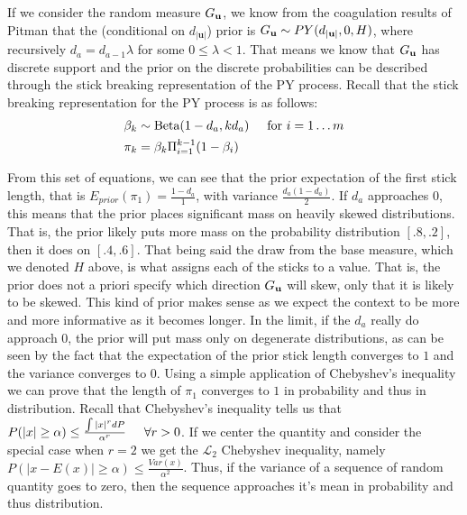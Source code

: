 \documentclass[11pt]{amsart}
\newcommand{\ubf}{\mathbf{u}}
\begin{document}
If we consider the random measure $G_{\bf{u}}$, we know from the coagulation results of Pitman \cite{pitman99} that the (conditional on $d_{|\ubf|}$) prior is  $G_{\bf{u}} \sim PY (d_{|\ubf|},0,{H})$, where recursively $d_a = d_{a-1}\lambda$ for some $0\leq \lambda < 1$.  That means we know that $G_{\bf{u}}$ has discrete support and the prior on the discrete probabilities can be described through the stick breaking representation of the PY process. Recall that the stick breaking representation for the PY process is as follows:
\begin{align*}
	\beta_k &\sim \textrm{Beta}(1-d_a, kd_a) \hspace{.5cm} \textrm{for } i = 1 \dots m \\
	\pi_k &= \beta_k \Pi_{i = 1}^{k-1}(1 - \beta_i)
\end{align*}

From this set of equations, we can see that the prior expectation of the first stick length, that is $E_{prior}(\pi_1) = \frac{1-d_a}{1}$, with variance $\frac{d_a(1-d_a)}{2}$.  If $d_a$ approaches $0$, this means that the prior places significant mass on heavily skewed distributions.  That is, the prior likely puts more mass on the probability distribution $[.8, .2]$, then it does on $[.4, .6]$.  That being said the draw from the base measure, which we denoted ${H}$ above, is what assigns each of the sticks to a value.  That is, the prior does not a priori specify which direction $G_{\bf{u}}$ will skew, only that it is likely to be skewed.  This kind of prior makes sense as we expect the context to be more and more informative as it becomes longer.  In the limit, if the $d_a$ really do approach $0$, the prior will put mass only on degenerate distributions, as can be seen by the fact that the expectation of the prior stick length converges to $1$ and the variance converges to $0$.  Using a simple application of Chebyshev's inequality we can prove that the length of $\pi_1$ converges to $1$ in probability and thus in distribution.  Recall that Chebyshev's inequality tells us that $P(|x| \geq \alpha) \leq \frac{\int |x|^r dP}{\alpha^r} \hspace{.5cm} \forall r>0 $.  If we center the quantity and consider the special case when $r = 2$ we get the $\mathcal{L}_2$ Chebyshev inequality, namely $P(|x - E(x)|\geq \alpha) \leq \frac{Var(x)}{\alpha^2}$.  Thus, if the variance of a sequence of random quantity goes to zero, then the sequence approaches it's mean in probability and thus distribution.
\end{document}
